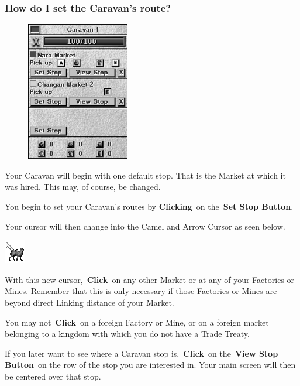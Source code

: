 \subsubsection{How do I set the Caravan’s route?}

\begin{figure}
	\vspace{-20pt}
	\begin{center}
		\includegraphics[width=0.4\textwidth]{Icamelinfo}
	\end{center}
	\vspace{-20pt}
\end{figure}

Your Caravan will begin with one default stop. That is the Market at which it was hired. This may, of course, be changed.

You begin to set your Caravan’s routes by \textbf{Clicking} on the \textbf{Set Stop Button}.

Your cursor will then change into the Camel and Arrow Cursor as seen below.

\includegraphics[width=0.1\linewidth]{Bcamel}


With this new cursor, \textbf{Click} on any other Market or at any of your Factories or Mines. Remember that this is only necessary if those Factories or Mines are beyond direct Linking distance of your Market.

You may not \textbf{Click} on a foreign Factory or Mine, or on a foreign market belonging to a kingdom with which you do not have a Trade Treaty.

If you later want to see where a Caravan stop is, \textbf{Click} on the \textbf{View Stop Button} on the row of the stop you are interested in. Your main screen will then be centered over that stop.

